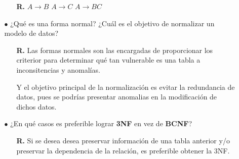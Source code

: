 \documentclass[12pt, letterpaper]{article}
\begin{document}
\begin{itemize}
\begin{itemize}
                                    \begin{itemize}

                                        \item[\textbf{R.}]  $A \rightarrow B$ \hspace{.5cm} 
                                                            $A \rightarrow C$ \hspace{.5cm} 
                                                            $A \rightarrow BC$
                                    
                                    \end{itemize}

                \item[$\bullet$]    ¿Qué es una forma normal? ¿Cuál es el objetivo de normalizar 
                                    un modelo de datos?

                                    \begin{itemize}

                                        \item[\textbf{R.}] Las formas normales son las encargadas 
                                                           de proporcionar los criterior para determinar
                                                           qué tan vulnerable es una tabla a inconsitencias
                                                           y anomalías. \vspace{.3cm}

                                                           Y el objetivo principal de la normalización
                                                           es evitar la redundancia de datos, pues se
                                                           podrías presentar anomalias en la modificación
                                                           de dichos datos.
                                    
                                    \end{itemize}

                \item[$\bullet$]    ¿En qué casos es preferible lograr \textbf{3NF} en vez de 
                                    \textbf{BCNF}?

                                    \begin{itemize}

                                        \item[\textbf{R.}] Si se desea desea preservar información
                                                           de una tabla anterior y/o preservar la 
                                                           dependencia de la relación, es preferible
                                                           obtener la 3NF. 
                                    

\end{itemize}
\end{itemize}
\end{itemize}
\end{document}
